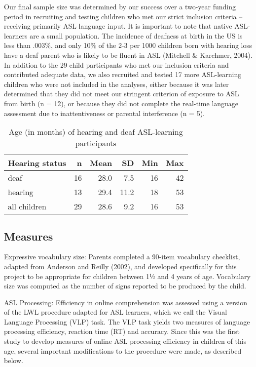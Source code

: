\documentclass[oneside]{report}
\begin{document}
Our final sample size was determined by our success over a two-year
funding period in recruiting and testing children who met our strict
inclusion criteria -- receiving primarily ASL language input. It is
important to note that native ASL-learners are a small population. The
incidence of deafness at birth in the US is less than .003\%, and only
10\% of the 2-3 per 1000 children born with hearing loss have a deaf
parent who is likely to be fluent in ASL (Mitchell \& Karchmer, 2004).
In addition to the 29 child participants who met our inclusion criteria
and contributed adequate data, we also recruited and tested 17 more
ASL-learning children who were not included in the analyses, either
because it was later determined that they did not meet our stringent
criterion of exposure to ASL from birth (n = 12), or because they did
not complete the real-time language assessment due to inattentiveness or
parental interference (n = 5).

\begingroup\fontsize{12}{14}\selectfont
\begin{longtable}[t]{lrrrrr}
\caption[Age of ASL-learning children]{\label{tab:sol-demo-table}Age (in months) of hearing and deaf ASL-learning participants}\\
\toprule
\textbf{Hearing status} & \textbf{n} & \textbf{Mean} & \textbf{SD} & \textbf{Min} & \textbf{Max}\\
\midrule
deaf & 16 & 28.0 & 7.5 & 16 & 42\\
hearing & 13 & 29.4 & 11.2 & 18 & 53\\
\hline
all children & 29 & 28.6 & 9.2 & 16 & 53\\
\bottomrule
\end{longtable}\endgroup{}
\hypertarget{measures}{%
\subsection{Measures}\label{measures}}

Expressive vocabulary size: Parents completed a 90-item vocabulary
checklist, adapted from Anderson and Reilly (2002), and developed
specifically for this project to be appropriate for children between 1½
and 4 years of age. Vocabulary size was computed as the number of signs
reported to be produced by the child.

ASL Processing: Efficiency in online comprehension was assessed using a
version of the LWL procedure adapted for ASL learners, which we call the
Visual Language Processing (VLP) task. The VLP task yields two measures
of language processing efficiency, reaction time (RT) and accuracy.
Since this was the first study to develop measures of online ASL
processing efficiency in children of this age, several important
modifications to the procedure were made, as described below.
\end{document}
